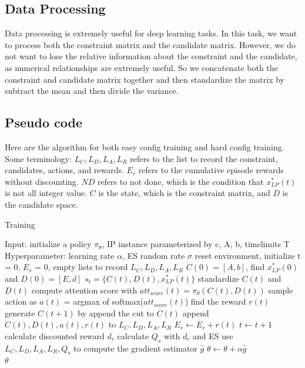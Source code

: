 \documentclass{article}
\begin{document}
\subsection{Data Processing}

Data processing is extremely useful for deep learning tasks. In this task, we want to process both the constraint matrix and the candidate matrix. However, we do not want to lose the relative information about the constraint and the candidate, as numerical relationships are extremely useful. So we concatenate both the constraint and candidate matrix together and then standardize the matrix by subtract the mean and then divide the variance.


\subsection{Pseudo code}


Here are the algorithm for both easy config training and hard config training. Some terminology: $L_C, L_D, L_A, L_R$ refers to the list to record the constraint, candidates, actions, and rewards. $E_r$ refers to the cumulative episode rewards without discounting. $ND$ refers to not done, which is the condition that $x^*_{LP}(t)$ is not all integer value. $C$ is the state, which is the constraint matrix, and $D$ is the candidate space.

\begin{algorithm}[H]
\caption{Training \cite{rlcut}}\label{alg:cap}
\begin{algorithmic}[1]
\State Input: initialize a policy $\pi_\theta$, IP instance parameterized by c, A, b, timelimits T 
\State Hyperparameter: learning rate $\alpha$, ES random rate $\sigma$
\State reset environment, initialize t = 0, $E_r$ = 0, empty lists to record $L_C, L_D, L_A, L_R$
\State $C(0) = [A,b]$, find $x^*_{LP}(0)$ and $D(0) = [E,d]$
	\State $s_t = \{C(t), D(t), x^*_{LP}(t)\}$
	\State standardize $C(t)$ and $D(t)$
	\State compute attention score with $att_{score}(t) = \pi_\theta(C(t), D(t))$
	\State sample action as $a(t)$ = argmax of softmax($att_{score}(t)$) 
	\State find the reward $r(t)$
	\State generate $C(t+1)$ by append the cut to $C(t)$
	\State append $C(t), D(t), a(t), r(t)$ to  $L_C, L_D, L_A, L_R$
	\State $E_r \gets E_r + r(t)$
	\State $t \gets t + 1$
\EndWhile
\State calculate discounted reward $d_r$
\State calculate $Q_s$ with $d_r$ and ES
\State use  $L_C, L_D, L_A, L_R, Q_s$ to compute the gradient estimator $\hat g$
\State $\theta \gets \theta + \alpha \hat g$
\EndFor \\
\Return $\theta$
\end{algorithmic}
\end{algorithm}
\end{document}
